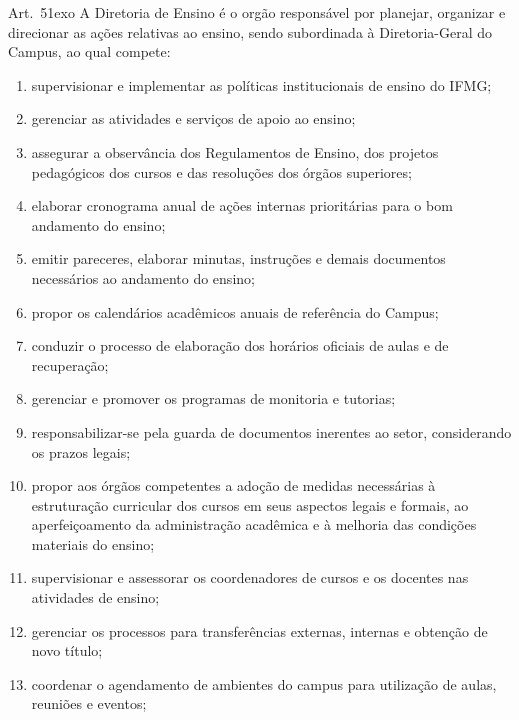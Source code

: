 \documentclass[a4paper,12pt]{report}
\newcommand{\ORD}[2]{#1\raise1ex\hbox{\scriptsize#2}}
\begin{document}
Art.~\ORD{5}{o} A Diretoria de Ensino é o orgão responsável por planejar, organizar e direcionar as ações relativas ao ensino, sendo subordinada à Diretoria-Geral do Campus, ao qual compete:

\begin{enumerate}
\renewcommand{\labelenumi}{\Roman{enumi}}

\item supervisionar e implementar as políticas institucionais de ensino do IFMG;

\item gerenciar as atividades e serviços de apoio ao ensino;

\item assegurar a observância dos Regulamentos de Ensino, dos projetos pedagógicos dos cursos 
e das resoluções dos órgãos superiores;

\item elaborar cronograma anual de ações internas prioritárias para o bom andamento do ensino;

\item emitir pareceres, elaborar minutas, instruções e demais documentos necessários ao andamento do ensino;

\item propor os calendários acadêmicos anuais de referência do Campus;

\item conduzir o processo de elaboração dos horários oficiais de aulas e de recuperação;

\item gerenciar e promover os programas de monitoria e tutorias;

\item responsabilizar-se pela guarda de documentos inerentes ao setor, considerando os prazos legais;

\item propor aos órgãos competentes a adoção de medidas necessárias à estruturação curricular dos cursos em seus aspectos legais e formais, ao aperfeiçoamento da administração acadêmica e à melhoria das condições materiais do ensino;

\item supervisionar e assessorar os coordenadores de cursos e os docentes nas atividades de ensino;

\item gerenciar os processos para transferências externas, internas e obtenção de novo título;

\item coordenar o agendamento de ambientes do campus para utilização de aulas, reuniões e eventos;


\end{enumerate}
\end{document}
